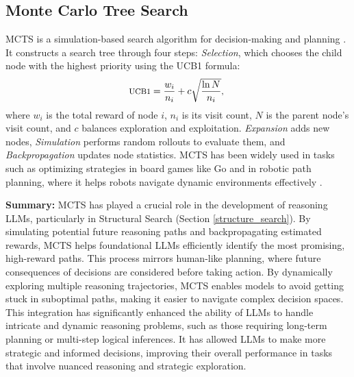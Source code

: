 

\subsection{Monte Carlo Tree Search}\label{mcts}

MCTS is a simulation-based search algorithm for decision-making and planning \cite{browne2012survey}. 
It constructs a search tree through four steps: \textit{Selection}, which chooses the child node with the highest priority using the UCB1 formula:
\begin{equation}
\footnotesize
\text{UCB1} = \frac{w_i}{n_i} + c \sqrt{\frac{\ln N}{n_i}} \text{, }
\end{equation}
where $w_i$ is the total reward of node $i$, $n_i$ is its visit count, $N$ is the parent node's visit count, and $c$ balances exploration and exploitation. \textit{Expansion} adds new nodes, \textit{Simulation} performs random rollouts to evaluate them, and \textit{Backpropagation} updates node statistics. 
MCTS has been widely used in tasks such as optimizing strategies in board games like Go \cite{gelly2011monte} and in robotic path planning, where it helps robots navigate dynamic environments effectively \cite{swiechowski2023monte}.



\noindent\textbf{Summary:} 
MCTS has played a crucial role in the development of reasoning LLMs, particularly in Structural Search (Section \ref{structure_search}). 
By simulating potential future reasoning paths and backpropagating estimated rewards, MCTS helps foundational LLMs efficiently identify the most promising, high-reward paths. 
This process mirrors human-like planning, where future consequences of decisions are considered before taking action. 
By dynamically exploring multiple reasoning trajectories, MCTS enables models to avoid getting stuck in suboptimal paths, making it easier to navigate complex decision spaces. 
This integration has significantly enhanced the ability of LLMs to handle intricate and dynamic reasoning problems, such as those requiring long-term planning or multi-step logical inferences. 
It has allowed LLMs to make more strategic and informed decisions, improving their overall performance in tasks that involve nuanced reasoning and strategic exploration.


